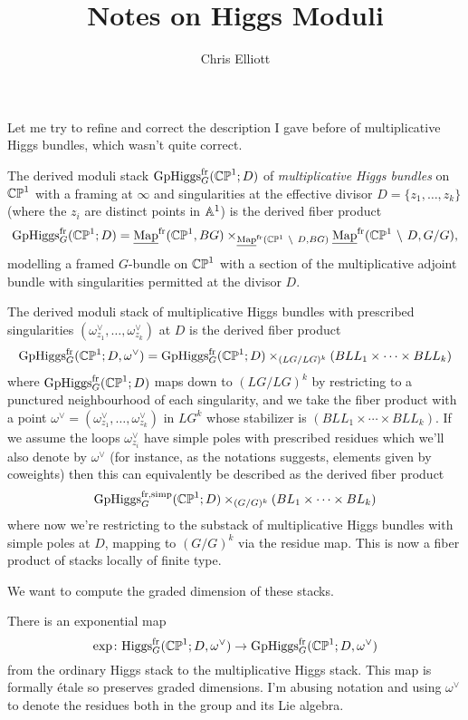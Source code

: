 \documentclass[10pt, oneside]{article}
\title{Notes on Higgs Moduli}
\author{Chris Elliott}
\newcommand{\map}{\underline{\mathrm{Map}}}
\begin{document}
\setcounter{section}{1}

\maketitle

Let me try to refine and correct the description I gave before of multiplicative Higgs bundles, which wasn't quite correct.  

\begin{definition}
The derived moduli stack $\mathrm{GpHiggs}_G^{\mathrm{fr}}(\mathbb{CP}^1; D)$ of \emph{multiplicative Higgs bundles} on $\mathbb{CP}^1$ with a framing at $\infty$ and singularities at the effective divisor $D = \{z_1, \ldots, z_k\}$ (where the $z_i$ are distinct points in $\mathbb{A}^1$) is the derived fiber product
\[\mr{GpHiggs}_G^\mr{fr}(\bb {CP}^1; D) = \map^{\mr{fr}}(\bb{CP}^1, BG) \times_{\map^{\mr{fr}}(\bb{CP}^1 \bs D, BG)} \map^{\mr{fr}}(\bb{CP}^1 \bs D, G/G),\]
modelling a framed $G$-bundle on $\mathbb{CP}^1$ with a section of the multiplicative adjoint bundle with singularities permitted at the divisor $D$.
\end{definition}

\begin{definition}
The derived moduli stack of multiplicative Higgs bundles with prescribed singularities $(\omega^\vee_{z_1}, \ldots, \omega^\vee_{z_k})$ at $D$ is the derived fiber product
\[\mathrm{GpHiggs}_G^{\mathrm{fr}}(\mathbb{CP}^1; D, \omega^\vee) = \mathrm{GpHiggs}_G^{\mathrm{fr}}(\mathbb{CP}^1; D) \times_{(LG/LG)^k} (BLL_1 \times \cdots \times BLL_k)\]
where $\mathrm{GpHiggs}_G^{\mathrm{fr}}(\mathbb{CP}^1; D)$ maps down to $(LG/LG)^k$ by restricting to a punctured neighbourhood of each singularity, and we take the fiber product with a point $\omega^\vee = (\omega^\vee_{z_1}, \ldots, \omega^\vee_{z_k})$ in $LG^k$ whose stabilizer is $(BLL_1 \times \cdots \times BLL_k)$.  If we assume the loops $\omega^\vee_{z_i}$ have simple poles with prescribed residues which we'll also denote by $\omega^\vee$ (for instance, as the notations suggests, elements given by coweights) then this can equivalently be described as the derived fiber product
\[\mathrm{GpHiggs}_G^\text{fr,simp}(\mathbb{CP}^1; D) \times_{(G/G)^k} (BL_1 \times \cdots \times BL_k)\]
where now we're restricting to the substack of multiplicative Higgs bundles with simple poles at $D$, mapping to $(G/G)^k$ via the residue map.  This is now a fiber product of stacks locally of finite type.
\end{definition}

We want to compute the graded dimension of these stacks.
\begin{prop}
There is an exponential map
\[\exp \colon \mathrm{Higgs}_G^{\mathrm{fr}}(\mathbb{CP}^1; D, \omega^\vee) \to \mathrm{GpHiggs}_G^{\mathrm{fr}}(\mathbb{CP}^1; D, \omega^\vee)\]
from the ordinary Higgs stack to the multiplicative Higgs stack.  This map is formally \'etale so preserves graded dimensions.  I'm abusing notation and using $\omega^\vee$ to denote the residues both in the group and its Lie algebra.
\end{prop}
\end{document}
